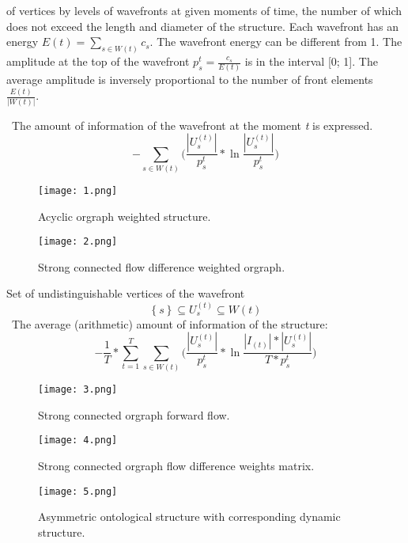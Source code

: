 \documentclass[10pt, a4paper]{article}
\begin{document}
\begin{multicols}{2}
of vertices by levels of wavefronts at given moments of
time, the number of which does not exceed the length
and diameter of the structure. Each wavefront has an
energy $E(t)=\sum_{s\in W(t)}c_s.$  The wavefront energy can be different from 1. The amplitude at the top of the
wavefront $p_s^t=\frac{c_s}{E(t)}$ is in the interval [0; 1]. The average amplitude is inversely proportional to the number of front elements $\frac{E(t)}{|W(t)|}$.
\par \ The amount of information of the wavefront at the
moment \textit{t} is expressed.
\[ -\sum_{s\in W(t)} \Bigg(\frac{|U_s^{(t)}|}{p_s^t}*\ln\frac{|U_s^{(t)}|}{p_s^t}\Bigg)\]
\vspace{-0,7cm}
\setcounter{figure}{1}
\begin{figure}[H]
\centering
\texttt{[image: 1.png]}
\caption{\small Acyclic orgraph weighted structure.}
\label{fig:mpr}
\end{figure}
 \vspace{-0,5cm}
\begin{figure}[H]
\centering
\texttt{[image: 2.png]}
\caption{\small Strong connected flow difference weighted orgraph.}
\label{fig:mpr}
\end{figure}
Set of undistinguishable vertices of the wavefront
     \[\left\{s\right\} \subseteq U_s^{(t)}\subseteq W(t)\]  
\ The average (arithmetic) amount of information of the
structure:
\[ -\frac{1}{T}*\sum_{t=1}^T \sum_{s\in W(t)} \Bigg(\frac{|U_s^{(t)}|}{p_s^t}*\ln\frac{|I_{(t)}|*{|U_s^{(t)}|}}{T*{p_s^t}}\Bigg)\]
 \vspace{-0,79cm}
\begin{figure}[H]
\centering
\texttt{[image: 3.png]}
\caption{\small Strong connected orgraph forward flow.}
\label{fig:mpr}
\end{figure}
\end{multicols}
\begin{figure}[H]
\centering
\texttt{[image: 4.png]}
\caption{\small  Strong connected orgraph flow difference weights matrix.}
\label{fig:mpr}
\end{figure}
\begin{figure}[H]
\centering
\texttt{[image: 5.png]}
\caption{\small Asymmetric ontological structure with corresponding dynamic structure.}
\label{fig:mpr}
\end{figure}
\end{document}
